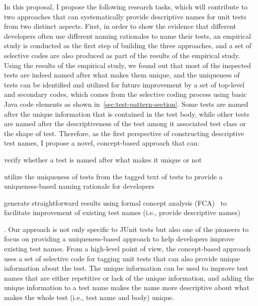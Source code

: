 In this proposal, I propose the following research tasks, which will contribute to two approaches that can systematically provide descriptive names for unit tests from two distinct aspects.
%
First, in order to show the evidence that different developers often use different naming rationales to name their tests, an empirical study is conducted as the first step of building the three approaches, and a set of selective codes are also produced as part of the results of the empirical study.
%
Using the results of the empirical study, we found out that most of the inspected tests are indeed named after what makes them unique, and the uniqueness of tests can be identified and utilized for future improvement by a set of top-level and secondary codes, which comes from the selective coding process using basic Java code elements as shown in~\cref{sec:test-pattern-section}.
%
Some tests are named after the unique information that is contained in the test body, while other tests are named after the descriptiveness of the test among it associated test class or the shape of test.
%
Therefore, as the first perspective of constructing descriptive test names, I propose a novel, concept-based approach that can:
%
\begin{enumerate*}
\item verify whether a test is named after what makes it unique or not
\item utilize the uniqueness of tests from the tagged text of tests to provide a uniqueness-based naming rationale for developers
\item generate straightforward results using formal concept analysis (FCA)~\cite{ganter2012formal} to facilitate improvement of existing test names (i.e., provide descriptive names)
\end{enumerate*}.
%
Our approach is not only specific to JUnit tests but also one of the pioneers to focus on providing a uniqueness-based approach to help developers improve existing test names.
%
From a high-level point of view, the concept-based approach uses a set of selective code for tagging unit tests that can also provide unique information about the test.
%
The unique information can be used to improve test names that are either repetitive or lack of the unique information, and adding the unique information to a test name makes the name more descriptive about what makes the whole test (i.e., test name and body) unique.


